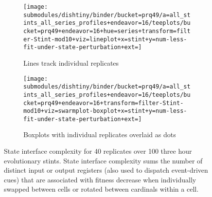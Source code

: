 \begin{figure}
\begin{center}

\begin{subfigure}[b]{\textwidth}
\centering
\texttt{[image: submodules/dishtiny/binder/bucket=prq49/a=all\_stints\_all\_series\_profiles+endeavor=16/teeplots/bucket=prq49+endeavor=16+hue=series+transform=filter-Stint-mod10+viz=lineplot+x=stint+y=num-less-fit-under-state-perturbation+ext=]}%
\caption{
Lines track individual replicates
}
\label{fig:state-interface-complexity-vs-stint-lineplot}
\end{subfigure}

\begin{subfigure}[b]{\columnwidth}
\centering
\texttt{[image: submodules/dishtiny/binder/bucket=prq49/a=all\_stints\_all\_series\_profiles+endeavor=16/teeplots/bucket=prq49+endeavor=16+transform=filter-Stint-mod10+viz=swarmplot-boxplot+x=stint+y=num-less-fit-under-state-perturbation+ext=]}
\caption{
Boxplots with individual replicates overlaid as dots
}
\label{fig:state-interface-complexity-vs-stint-boxplot}
\end{subfigure}

\caption{
State interface complexity for 40 replicates over 100 three hour evolutionary stints.
State interface complexity sums the number of distinct input or output registers (also used to dispatch event-driven cues) that are associated with fitness decrease when individually swapped between cells or rotated between cardinals within a cell.
}
\label{fig:state-interface-complexity-vs-stint}

\end{center}
\end{figure}
